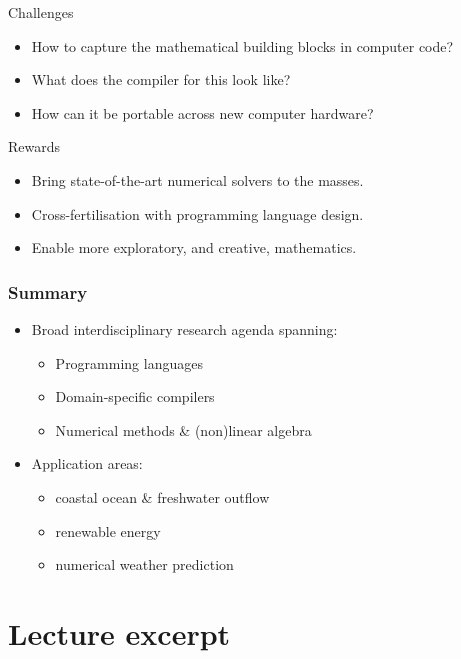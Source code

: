 \documentclass[presentation]{beamer}
\begin{document}
\begin{frame}
  \begin{block}{Challenges}
    \begin{itemize}
    \item How to capture the mathematical building blocks in computer
      code?
    \item What does the compiler for this look like?
    \item How can it be portable across new computer hardware?
    \end{itemize}
  \end{block}
  \begin{block}{Rewards}
    \begin{itemize}
    \item Bring state-of-the-art numerical solvers to the masses.
    \item Cross-fertilisation with programming language design.
    \item Enable more exploratory, and creative, mathematics.
    \end{itemize}
  \end{block}
\end{frame}


\begin{frame}
  \frametitle{Summary}
  \begin{itemize}
  \item Broad interdisciplinary research agenda spanning:
    \begin{itemize}
    \item Programming languages
    \item Domain-specific compilers
    \item Numerical methods \& (non)linear algebra
    \end{itemize}
  \item Application areas:
    \begin{itemize}
    \item coastal ocean \& freshwater outflow
    \item renewable energy
    \item numerical weather prediction
    \end{itemize}
  \end{itemize}
\end{frame}


\section{Lecture excerpt}
\end{document}
